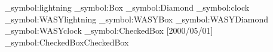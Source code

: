{  
}
\ifengine{\UTFDeclarations}{\UTFDeclarations}{}
\ifxetex\else\ifluatex\else
  \RequirePackage{textcomp}
  \RequirePackage{mathcomp}
  \fi
\fi
\ifxetex
    \else
     \ifluatex
     \else
     \fi
\fi
\newcommand{\tabitem}[2]{%
  \texttt{\symbol{`\\}#1} & \@nameuse{#1}
   & \bfseries\@nameuse{#1}& \itshape\@nameuse{#1}
   \ifthenelse{\equal{#2}{}}
    {}
    {& \texttt{\symbol{`\\}#2} & \@nameuse{#2}
     & \bfseries\@nameuse{#2}
     & \itshape\@nameuse{#2} \\}
}
\ExplSyntaxOn
\newif\ifWASY
\newcommand\WASY{\pkgname{wasysym}}
  {\WASYtrue
   \save_symbol:{lightning}
   \save_symbol:{Box}
   \save_symbol:{Diamond}
   \save_symbol:{clock}
   \RequirePackage{wasysym}
   \restore_symbol:{WASY}{lightning}
   \restore_symbol:{WASY}{Box}
   \restore_symbol:{WASY}{Diamond}
   \restore_symbol:{WASY}{clock}
  }
  {}
\ExplSyntaxOff
\newif\ifPI
\newcommand\PI{\pkgname{pifont}}
  {\PItrue\RequirePackage{pifont}}
  {}
\ExplSyntaxOn
\newif\ifMARV
\newcommand\MARV{\pkgname{marvosym}}
  {\save_symbol:{CheckedBox}
   \RequirePackage{marvosym}[2000/05/01]%
   \global\MARVtrue
   \restore_symbol:{CheckedBox}{CheckedBox}
     {\global\MARVfalse}
     {}
     {\global\MARVfalse}
     {}
  }
  {}
\ExplSyntaxOff

